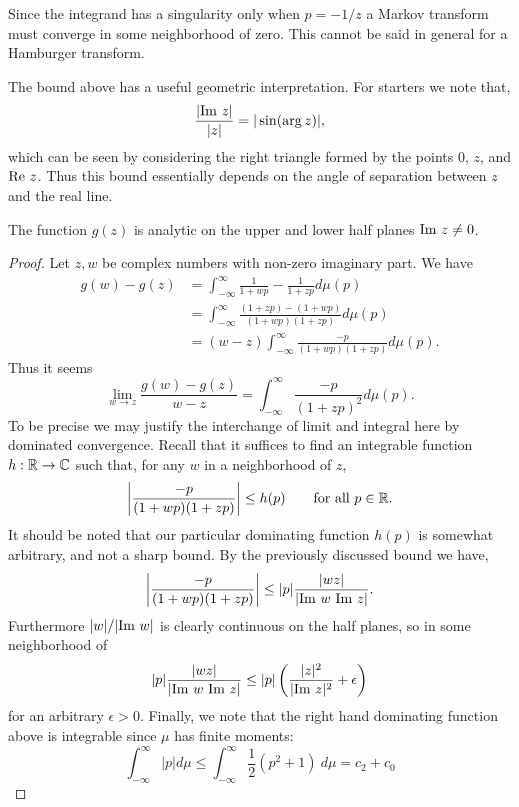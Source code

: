 Since the integrand has a singularity only when $p = -1/z$ a Markov transform must converge in some neighborhood of zero. This cannot be said in general for a Hamburger transform. 

\begin{remark}
  The bound above has a useful geometric interpretation. For starters we note that,
  \[
    \frac{|\text{Im}~ z|}{|z|} = |\sin(\arg z)|,
  \]
  which can be seen by considering the right triangle formed by the points $0$, $z$, and $\text{Re}~ z$. Thus this bound essentially depends on the angle of separation between $z$ and the real line. 
\end{remark}

\begin{proposition}
  The function $g(z)$ is analytic on the upper and lower half planes $\text{Im}~ z \neq 0$.
\end{proposition}

\begin{proof}
  Let $z, w$ be complex numbers with non-zero imaginary part. We have
  \begin{align*}
    g(w) - g(z)
    &= \int_{-\infty}^\infty \frac{1}{1 + wp} - \frac1{1 + zp}d\mu(p) \\
    &= \int_{-\infty}^\infty \frac{(1 + zp) - (1 + wp)}{(1 + wp)(1 + zp)}d\mu(p) \\
    &= (w - z) \int_{-\infty}^\infty \frac{-p}{(1 + wp)(1 + zp)}d\mu(p).
  \end{align*}
  Thus it seems
  \[
    \lim_{w \rightarrow z} \frac{g(w) - g(z)}{w - z} = \int_{-\infty}^\infty \frac{-p}{(1+zp)^2}d\mu(p).
  \]
  To be precise we may justify the interchange of limit and integral here by dominated convergence. Recall that it suffices to find an integrable function $h : \mathbb{R} \to \mathbb{C}$ such that, for any $w$ in a neighborhood of $z$,
  \[
    \left|\frac{-p}{(1 + wp)(1 + zp)}\right| \leq h(p) \qquad \hbox{for all $p \in \mathbb{R}$}.
  \]
  It should be noted that our particular dominating function $h(p)$ is somewhat arbitrary, and not a sharp bound. By the previously discussed bound we have,
  \[
    \left|\frac{-p}{(1 + wp)(1 + zp)}\right| \leq |p|\frac{|wz|}{|\text{Im}~ w ~\text{Im}~ z|}.
  \]
  Furthermore $|w|/|\text{Im}~ w|$ is clearly continuous on the half planes, so in some neighborhood of 
  \[
    |p|\frac{|wz|}{|\text{Im}~ w ~\text{Im}~ z|} \leq |p|\left(\frac{|z|^2}{|\text{Im}~ z|^2} + \epsilon\right)
  \]
  for an arbitrary $\epsilon > 0$. Finally, we note that the right hand dominating function above is integrable since $\mu$ has finite moments: 
  \[
    \int_{-\infty}^\infty |p| d\mu \leq \int_{-\infty}^\infty \frac12(p^2 + 1) ~d\mu = c_2 + c_0
  \]
\end{proof}

